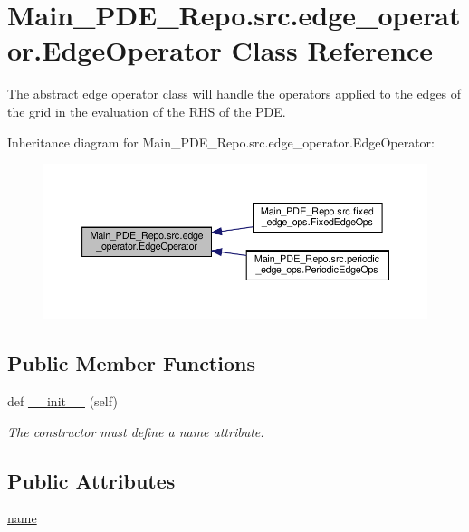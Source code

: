 \hypertarget{classMain__PDE__Repo_1_1src_1_1edge__operator_1_1EdgeOperator}{}\section{Main\+\_\+\+P\+D\+E\+\_\+\+Repo.\+src.\+edge\+\_\+operator.\+Edge\+Operator Class Reference}
\label{classMain__PDE__Repo_1_1src_1_1edge__operator_1_1EdgeOperator}


The abstract edge operator class will handle the operators applied to the edges of the grid in the evaluation of the R\+HS of the P\+DE.  




Inheritance diagram for Main\+\_\+\+P\+D\+E\+\_\+\+Repo.\+src.\+edge\+\_\+operator.\+Edge\+Operator\+:
\nopagebreak
\begin{figure}[H]
\begin{center}
\leavevmode
\includegraphics[width=350pt]{classMain__PDE__Repo_1_1src_1_1edge__operator_1_1EdgeOperator__inherit__graph}
\end{center}
\end{figure}
\subsection*{Public Member Functions}
\begin{DoxyCompactItemize}
\item 
def \hyperlink{classMain__PDE__Repo_1_1src_1_1edge__operator_1_1EdgeOperator_a8b441be8ab71393470f0f3e3d983889c}{\+\_\+\+\_\+init\+\_\+\+\_\+} (self)
\begin{DoxyCompactList}\small\item\em The constructor must define a name attribute. \end{DoxyCompactList}\end{DoxyCompactItemize}
\subsection*{Public Attributes}
\begin{DoxyCompactItemize}
\item 
\hyperlink{classMain__PDE__Repo_1_1src_1_1edge__operator_1_1EdgeOperator_a19f49094799db39bb5e4b218cef656eb}{name}
\end{DoxyCompactItemize}
